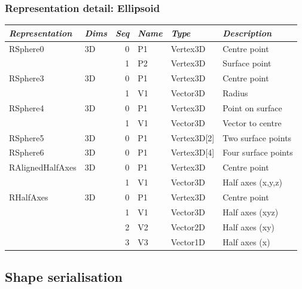 \documentclass{beamer}
\begin{document}
\begin{frame}[fragile]
  \frametitle{Representation detail: Ellipsoid}
\scriptsize
\begin{tabular}{llrlll}
\textit{Representation} &  \textit{Dims} & \textit{Seq} & \textit{Name}  & \textit{Type}         & \textit{Description} \\
\toprule
RSphere0          & 3D   & 0   & P1  & Vertex3D     & Centre point \\
                  &      & 1   & P2  & Vertex3D     & Surface point \\
\cmidrule{3-6}
RSphere3          & 3D   & 0   & P1  & Vertex3D     & Centre point \\
                  &      & 1   & V1  & Vector3D     & Radius \\
\cmidrule{3-6}
RSphere4          & 3D   & 0   & P1  & Vertex3D     & Point on surface \\
                  &      & 1   & V1  & Vector3D     & Vector to centre \\
\cmidrule{3-6}
RSphere5          & 3D   & 0   & P1  & Vertex3D[2]  & Two surface points \\
\cmidrule{3-6}
RSphere6          & 3D   & 0   & P1  & Vertex3D[4]  & Four surface points \\
RAlignedHalfAxes  & 3D   & 0   & P1  & Vertex3D     & Centre point \\
                  &      & 1   & V1  & Vector3D     & Half axes (x,y,z) \\
\cmidrule{3-6}
RHalfAxes         & 3D   & 0   & P1  & Vertex3D     & Centre point \\
                  &      & 1   & V1  & Vector3D     & Half axes (xyz) \\
                  &      & 2   & V2  & Vector2D     & Half axes (xy) \\
                  &      & 3   & V3  & Vector1D     & Half axes (x) \\
\end{tabular}
\end{frame}

\subsection{Shape serialisation}

\end{document}
